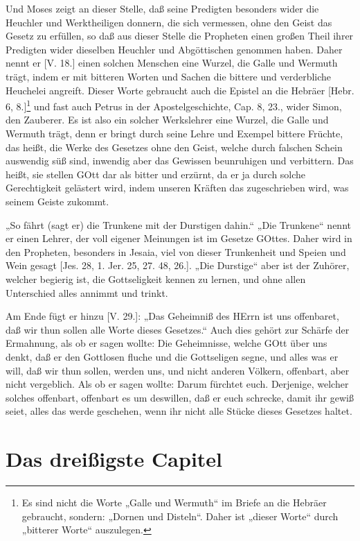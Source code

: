 Und Moses zeigt an dieser Stelle, daß seine Predigten besonders wider die Heuchler und Werktheiligen donnern, die sich vermessen, ohne den Geist das Gesetz zu erfüllen, so daß aus dieser Stelle die Propheten einen großen Theil ihrer Predigten wider dieselben Heuchler und Abgöttischen genommen haben. Daher nennt er [V. 18.] einen solchen Menschen eine Wurzel, die Galle und Wermuth trägt, indem er mit
bitteren Worten und Sachen die bittere und verderbliche Heuchelei angreift. Dieser Worte gebraucht auch die Epistel an die Hebräer [Hebr. 6, 8.]\footnote{Es sind nicht die Worte „Galle und Wermuth“ im Briefe an die Hebräer gebraucht, sondern: „Dornen und Disteln“. Daher ist „dieser Worte“ durch „bitterer Worte“ auszulegen.} und fast auch Petrus in der Apostelgeschichte, Cap. 8, 23., wider Simon, den Zauberer. Es ist also ein solcher Werkslehrer eine Wurzel, die Galle und Wermuth trägt, denn er bringt durch seine Lehre und Exempel bittere Früchte, das heißt, die Werke des Gesetzes ohne den Geist, welche durch falschen Schein auswendig süß sind, inwendig aber das Gewissen beunruhigen und verbittern. Das heißt, sie stellen GOtt dar als bitter und erzürnt, da er ja durch solche Gerechtigkeit gelästert wird, indem unseren Kräften das zugeschrieben wird, was seinem Geiste zukommt.

„So fährt (sagt er) die Trunkene mit der Durstigen dahin.“ „Die Trunkene“ nennt er einen Lehrer, der voll eigener Meinungen ist im Gesetze GOttes. Daher wird in den Propheten, besonders in Jesaia, viel von dieser Trunkenheit und Speien und Wein gesagt [Jes. 28, 1. Jer. 25, 27. 48, 26.]. „Die Durstige“ aber ist der Zuhörer, welcher begierig ist, die Gottseligkeit kennen zu lernen, und ohne allen Unterschied alles annimmt und trinkt.

Am Ende fügt er hinzu [V. 29.]: „Das Geheimniß des HErrn ist uns offenbaret, daß wir thun sollen alle Worte dieses Gesetzes.“ Auch dies gehört zur Schärfe der Ermahnung, als ob er sagen wollte: Die Geheimnisse, welche GOtt über uns denkt, daß er den Gottlosen fluche und die Gottseligen segne, und alles was er will, daß wir thun sollen, werden uns, und nicht anderen Völkern, offenbart, aber nicht vergeblich. Als ob er sagen wollte: Darum fürchtet euch. Derjenige, welcher solches offenbart, offenbart es um deswillen, daß er euch schrecke, damit ihr gewiß seiet, alles das werde geschehen, wenn ihr nicht alle Stücke dieses Gesetzes haltet.

\section{Das dreißigste Capitel}


